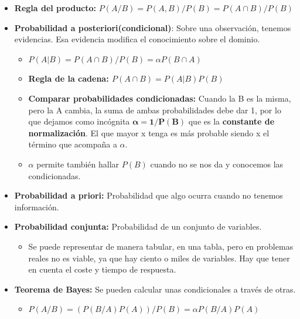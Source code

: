 \documentclass[12pt, twoside, openright]{report} %
\begin{document}
\begin{itemize}
  \item \textbf{Regla del producto:} $P(A/B)= P(A, B)/P(B)=P(A \cap B)/P(B)$
    \pagebreak
  \item \textbf{Probabilidad a posteriori(condicional)}: Sobre una
    observación, tenemos evidencias. Esa evidencia modifica el
    conocimiento sobre el dominio.
    

    \begin{itemize}
    \item \textbf{$P(A| B)=P(A \cap B)/P(B)=\alpha P(B \cap A)$}
      
    \item \textbf{Regla de la cadena: $P(A \cap B)=P(A| B)P(B)$}
      
    \item \textbf{Comparar probabilidades condicionadas:} Cuando la B es la
      misma, pero la A cambia, la suma de ambas probabilidades debe dar
      1, por lo que dejamos como incógnita $\boldsymbol{\alpha=1/P(B)}$ que es la
      \textbf{constante de normalización}. El que mayor x tenga es más
      probable siendo x el término que acompaña a $\alpha$.
      
    \item $\alpha$ permite también hallar $P(B)$ cuando no se nos da y conocemos las
      condicionadas.
      
    \end{itemize}
  \item \textbf{Probabilidad a priori:} Probabilidad que algo ocurra cuando
    no tenemos información.
    
  \item \textbf{Probabilidad conjunta:} Probabilidad de un conjunto de
    variables.
    

    \begin{itemize}
    \item Se puede representar de manera tabular, en una tabla, pero en
      problemas reales no es viable, ya que hay ciento o miles de
      variables. Hay que tener en cuenta el coste y tiempo de respuesta.
      
    \end{itemize}
  \item \textbf{Teorema de Bayes:} Se pueden calcular unas condicionales a
    través de otras.
    

    \begin{itemize}
    \item \textbf{$P(A/B)=(P(B/A)P(A))/P(B)=\alpha P(B/A)P(A)$}
      

\end{itemize}
\end{itemize}
\end{document}
